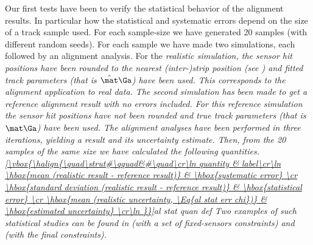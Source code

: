 Our first  tests have been to verify the statistical behavior of the alignment results. In particular how the statistical and systematic errors depend on the size of a track sample used. For each sample-size we have generated 20 samples (with different random seeds). For each sample we have made two simulations, each followed by an alignment analysis. For the \em{realistic simulation}, the sensor hit positions have been rounded to the nearest (inter-)strip position (see ) and fitted track parameters (that is $\hat\mat\Ga$) have been used. This corresponds to the alignment application to real data. The second simulation has been made to get a reference alignment result with no errors included. For this \em{reference simulation} the sensor hit positions have not been rounded and true track parameters (that is $\mat\Ga$) have been used. The alignment analyses have been performed in three iterations, yielding a result and its uncertainty estimate. Then, from the 20 samples of the same size we have calculated the following quantities.
\eqref{\vbox{\halign{\quad\strut#\qquad&#\quad\cr\ln
quantity & label\cr\ln
\hbox{mean (realistic result - reference result)}				& \hbox{systematic error} \cr
\hbox{standard deviation (realistic result - reference result)}	& \hbox{statistical error} \cr
\hbox{mean (realistic uncertainty, \Eq{al stat err chi})} 		& \hbox{estimated uncertainty} \cr\ln
}}}{al stat quan def}
Two examples of such statistical studies can be found in  (with a set of fixed-sensors constraints) and  (with the final constraints).


